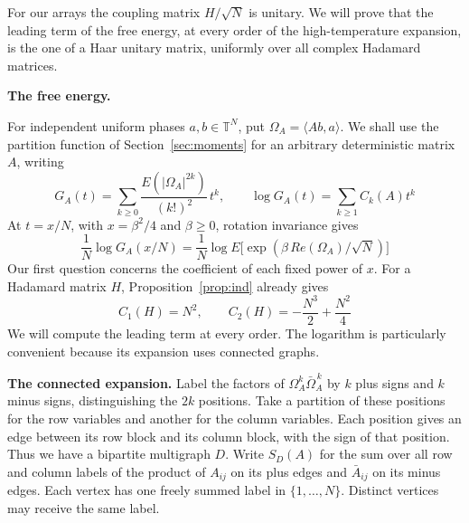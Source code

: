 \documentclass[11pt,a4paper]{article}
\theoremstyle{remark}
\begin{document}
For our arrays the coupling matrix $H/\sqrt N$ is unitary. We will prove that the leading term of the free energy, at every order of the high-temperature expansion, is the one of a Haar unitary matrix, uniformly over all complex Hadamard matrices.

\medskip
\noindent\textbf{The free energy.}

For independent uniform phases $a,b\in\mathbb T^N$, put
$\Omega_A=\langle Ab,a\rangle$. We shall use the partition function of
Section~\ref{sec:moments} for an arbitrary deterministic matrix $A$, writing
\[
 G_A(t)=\sum_{k\geq0}\frac{E(|\Omega_A|^{2k})}{(k!)^2}\,t^k,
 \qquad \log G_A(t)=\sum_{k\geq1} C_k(A)t^k
\]
At $t=x/N$, with $x=\beta^2/4$ and $\beta\geq0$, rotation invariance gives
\[
 \frac1N\log G_A(x/N)
   =\frac1N\log E\big[\exp(\beta\,Re(\Omega_A)/\sqrt N)\big]
\]
Our first question concerns the coefficient of each fixed power of $x$.
For a Hadamard matrix $H$, Proposition~\ref{prop:ind} already gives
\[
 C_1(H)=N^2,\qquad C_2(H)=-\frac{N^3}{2}+\frac{N^2}{4}
\]
We will compute the leading term at every order. The logarithm is
particularly convenient because its expansion uses connected graphs.

\medskip
\noindent\textbf{The connected expansion.}
Label the factors of $\Omega_A^k\bar\Omega_A^{\,k}$ by $k$ plus signs and
$k$ minus signs, distinguishing the $2k$ positions. Take a partition of
these positions for the row variables and another for the column variables.
Each position gives an edge between its row block and its column block,
with the sign of that position. Thus we have a bipartite multigraph $D$.
Write $S_D(A)$ for the sum over all row and column labels of the product
of $A_{ij}$ on its plus edges and $\bar A_{ij}$ on its minus edges.
Each vertex has one freely summed label in $\{1,\ldots,N\}$.
Distinct vertices may receive the same label.
\end{document}
